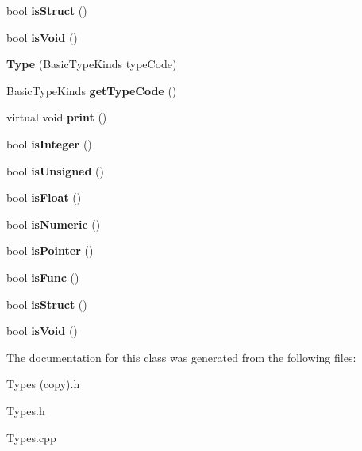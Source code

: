\begin{DoxyCompactItemize}
bool {\bfseries is\+Struct} ()
\item 
\mbox{\label{classspan_1_1ir_1_1types_1_1Type_a949e9e027abf854bf1714ae02a078a5e}} 
bool {\bfseries is\+Void} ()
\item 
\mbox{\label{classspan_1_1ir_1_1types_1_1Type_a3f6163fcc2aa87bb104ed94d0f3212b9}} 
{\bfseries Type} (Basic\+Type\+Kinds type\+Code)
\item 
\mbox{\label{classspan_1_1ir_1_1types_1_1Type_a9e13548ef5aa1f44aeb65b6e5cac6893}} 
Basic\+Type\+Kinds {\bfseries get\+Type\+Code} ()
\item 
\mbox{\label{classspan_1_1ir_1_1types_1_1Type_a60731408750a7f723c7fe23ac13a9260}} 
virtual void {\bfseries print} ()
\item 
\mbox{\label{classspan_1_1ir_1_1types_1_1Type_a70459a5409a57db4850aa0e2715afcbb}} 
bool {\bfseries is\+Integer} ()
\item 
\mbox{\label{classspan_1_1ir_1_1types_1_1Type_a61193131f53ef462f0d2597c3a3aa672}} 
bool {\bfseries is\+Unsigned} ()
\item 
\mbox{\label{classspan_1_1ir_1_1types_1_1Type_a54000c25eb3f6846047f0b3e721b7b1e}} 
bool {\bfseries is\+Float} ()
\item 
\mbox{\label{classspan_1_1ir_1_1types_1_1Type_aefda2054996b62f24684ba759319c30d}} 
bool {\bfseries is\+Numeric} ()
\item 
\mbox{\label{classspan_1_1ir_1_1types_1_1Type_a80171ad0549f9175f9f4e2ebd6680b63}} 
bool {\bfseries is\+Pointer} ()
\item 
\mbox{\label{classspan_1_1ir_1_1types_1_1Type_aa42ffaf20d7608233d71b92d269775ea}} 
bool {\bfseries is\+Func} ()
\item 
\mbox{\label{classspan_1_1ir_1_1types_1_1Type_a4c26d42aa7df67c2bdd6ba1069a84650}} 
bool {\bfseries is\+Struct} ()
\item 
\mbox{\label{classspan_1_1ir_1_1types_1_1Type_a0271017ec818928be7103216039bc2b5}} 
bool {\bfseries is\+Void} ()
\end{DoxyCompactItemize}


The documentation for this class was generated from the following files\+:\begin{DoxyCompactItemize}
\item 
Types (copy).\+h\item 
Types.\+h\item 
Types.\+cpp\end{DoxyCompactItemize}
